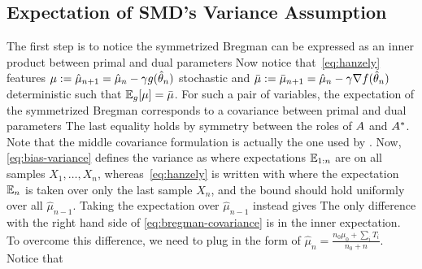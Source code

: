 \begin{subappendices}
\subsection{Expectation of SMD's Variance Assumption}
The first step is to notice the symmetrized Bregman can be expressed as an inner product between primal and dual parameters
Now notice that~\eqref{eq:hanzely} features $\mu := \hat \mu_{n+1} = \hat{\mu}_{n} - \gamma g(\hat {\theta}_{n})$ stochastic and $\bar\mu := \bar\mu_{n+1} =  \hat{\mu}_{n}   -\gamma \nabla f(\hat {\theta}_{n})$ deterministic such that $\operatorname{\mathbb{E}}_g[\mu] = \bar\mu$.
For such a pair of variables, the expectation of the symmetrized Bregman corresponds to a covariance between primal and dual parameters
The last equality holds by symmetry between the roles of $A$ and ${A^*}$.
Note that the middle covariance formulation is actually the one  used by \citet{hanzely2018fastest}.
Now, \cref{eq:bias-variance} defines the variance as 
where expectations $\operatorname{\mathbb{E}}_{1:n}$ are on all samples $X_1, \dots, X_n$, whereas~\eqref{eq:hanzely} is written with 
where the expectation $\operatorname{\mathbb{E}}_{n}$ is taken over only the last sample $X_n$, and the bound should hold uniformly over all $\hat\mu_{n-1}$.
Taking the expectation over $\hat\mu_{n-1}$ instead gives
The only difference with the right hand side of \cref{eq:bregman-covariance} is in the inner expectation.
To overcome this difference, we need to plug in the form of $\hat \mu_n = \frac{n_0\mu_0 + \sum_i T_i}{n_0 +n}$. Notice that 
\end{subappendices}
